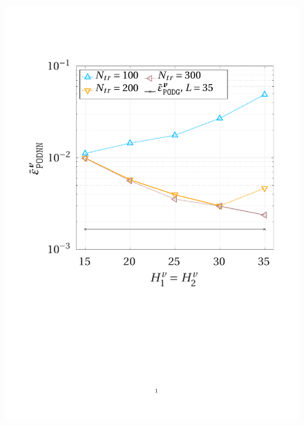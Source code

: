 \documentclass{elsarticle}
\numberwithin{equation}{section}
\theoremstyle{theorem}
\theoremstyle{definition}
\theoremstyle{remark}
\theoremstyle{proposition}
\numberwithin{figure}{section}
\begin{document}
		\begin{figure}[t]
			\center
			\includegraphics[scale = 0.37, trim = {1cm 9cm 1.5cm 3.5cm}, clip]{dc_200_vel_nn_convergence}
			\hspace*{1cm}

\end{figure}
\end{document}
